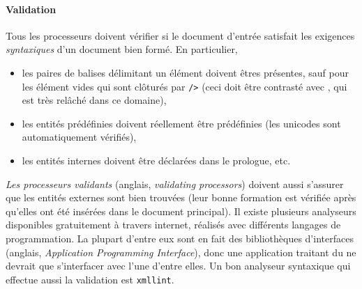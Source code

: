 \paragraph{Validation}

Tous les processeurs \XML doivent vérifier si le document d'entrée
satisfait les exigences \emph{syntaxiques} d'un document \XML bien
formé. En particulier,
\begin{itemize}

  \item les paires de balises délimitant un élément doivent êtres
    présentes, sauf pour les élément vides qui sont clôturés par
    \texttt{/>} (ceci doit être contrasté avec \HTML, qui est très
    relâché dans ce domaine),

  \item les entités prédéfinies doivent réellement être prédéfinies
    (les unicodes sont automatiquement vérifiés),

  \item les entités internes doivent être déclarées dans le prologue,
    etc.

\end{itemize}
\emph{Les processeurs validants} (anglais, \emph{validating
  processors}) doivent aussi s'assurer que les entités externes sont
bien trouvées (leur bonne formation est vérifiée après qu'elles ont
été insérées dans le document principal). Il existe plusieurs
analyseurs \XML disponibles gratuitement à travers internet, réalisés
avec différents langages de programmation. La plupart d'entre eux sont
en fait des bibliothèques d'interfaces (anglais, \emph{Application
  Programming Interface}), donc une application traitant du \XML ne
devrait que s'interfacer avec l'une d'entre elles. Un bon analyseur
syntaxique qui effectue aussi la validation est \texttt{xmllint}.

\mypar{\HTML}

